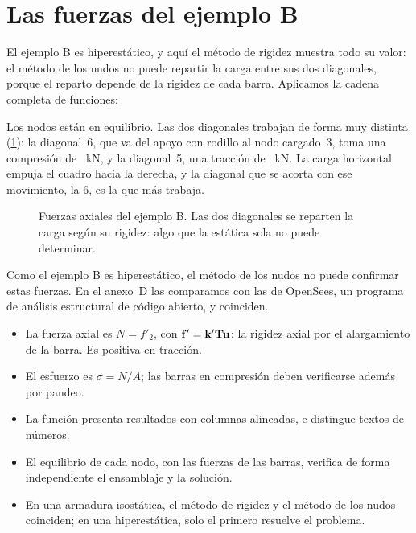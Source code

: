 \section{Las fuerzas del ejemplo B}\label{sec:fuerzas_b}

El ejemplo B es hiperestático, y aquí el método de rigidez muestra todo su
valor: el método de los nudos no puede repartir la carga entre sus dos
diagonales, porque el reparto depende de la rigidez de cada barra. Aplicamos
la cadena completa de funciones:

Los nodos están en equilibrio. Las dos diagonales trabajan de forma muy
distinta (\cref{fig:resultados_ejemplo_b}): la diagonal~6, que va del apoyo
con rodillo al nodo cargado~3, toma una compresión de
~\si{\kilo\newton}, y la diagonal~5, una tracción de
~\si{\kilo\newton}. La carga horizontal empuja el
cuadro hacia la derecha, y la diagonal que se acorta con ese movimiento, la
6, es la que más trabaja.

\begin{figure}[ht]
  \centering
  \caption{Fuerzas axiales del ejemplo B. Las dos diagonales se reparten la
    carga según su rigidez: algo que la estática sola no puede determinar.}
  \label{fig:resultados_ejemplo_b}
\end{figure}

Como el ejemplo B es hiperestático, el método de los nudos no puede
confirmar estas fuerzas. En el anexo~D las comparamos con las de OpenSees,
un programa de análisis estructural de código abierto, y coinciden.

\repasoyresumen

\begin{itemize}
  \item La fuerza axial es $N = f'_2$, con $\mathbf{f}' = \mathbf{k}'\mathbf{T}\mathbf{u}$: la rigidez
    axial por el alargamiento de la barra. Es positiva en tracción.
  \item El esfuerzo es $\sigma = N/A$; las barras en compresión deben
    verificarse además por pandeo.
  \item La función  presenta resultados con columnas
    alineadas, e  distingue textos de números.
  \item El equilibrio de cada nodo, con las fuerzas de las barras, verifica
    de forma independiente el ensamblaje y la solución.
  \item En una armadura isostática, el método de rigidez y el método de los
    nudos coinciden; en una hiperestática, solo el primero resuelve el
    problema.
\end{itemize}


